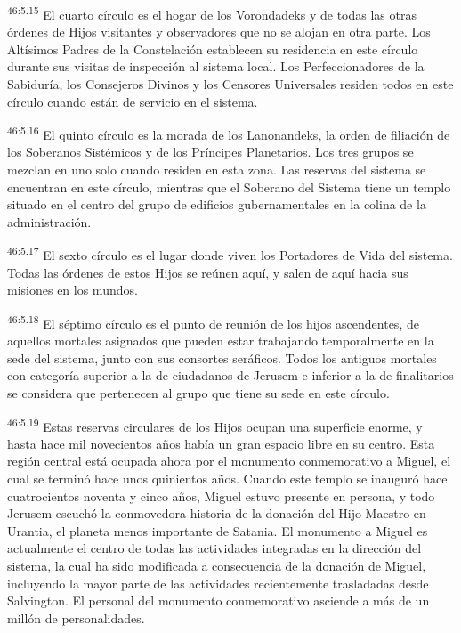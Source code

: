 \par
\textsuperscript{46:5.15} El cuarto círculo es el hogar de los Vorondadeks y de todas las otras órdenes de Hijos visitantes y observadores que no se alojan en otra parte. Los Altísimos Padres de la Constelación establecen su residencia en este círculo durante sus visitas de inspección al sistema local. Los Perfeccionadores de la Sabiduría, los Consejeros Divinos y los Censores Universales residen todos en este círculo cuando están de servicio en el sistema.

\par
\textsuperscript{46:5.16} El quinto círculo es la morada de los Lanonandeks, la orden de filiación de los Soberanos Sistémicos y de los Príncipes Planetarios. Los tres grupos se mezclan en uno solo cuando residen en esta zona. Las reservas del sistema se encuentran en este círculo, mientras que el Soberano del Sistema tiene un templo situado en el centro del grupo de edificios gubernamentales en la colina de la administración.

\par
\textsuperscript{46:5.17} El sexto círculo es el lugar donde viven los Portadores de Vida del sistema. Todas las órdenes de estos Hijos se reúnen aquí, y salen de aquí hacia sus misiones en los mundos.

\par
\textsuperscript{46:5.18} El séptimo círculo es el punto de reunión de los hijos ascendentes, de aquellos mortales asignados que pueden estar trabajando temporalmente en la sede del sistema, junto con sus consortes seráficos. Todos los antiguos mortales con categoría superior a la de ciudadanos de Jerusem e inferior a la de finalitarios se considera que pertenecen al grupo que tiene su sede en este círculo.

\par
\textsuperscript{46:5.19} Estas reservas circulares de los Hijos ocupan una superficie enorme, y hasta hace mil novecientos años había un gran espacio libre en su centro. Esta región central está ocupada ahora por el monumento conmemorativo a Miguel, el cual se terminó hace unos quinientos años. Cuando este templo se inauguró hace cuatrocientos noventa y cinco años, Miguel estuvo presente en persona, y todo Jerusem escuchó la conmovedora historia de la donación del Hijo Maestro en Urantia, el planeta menos importante de Satania. El monumento a Miguel es actualmente el centro de todas las actividades integradas en la dirección del sistema, la cual ha sido modificada a consecuencia de la donación de Miguel, incluyendo la mayor parte de las actividades recientemente trasladadas desde Salvington. El personal del monumento conmemorativo asciende a más de un millón de personalidades.

